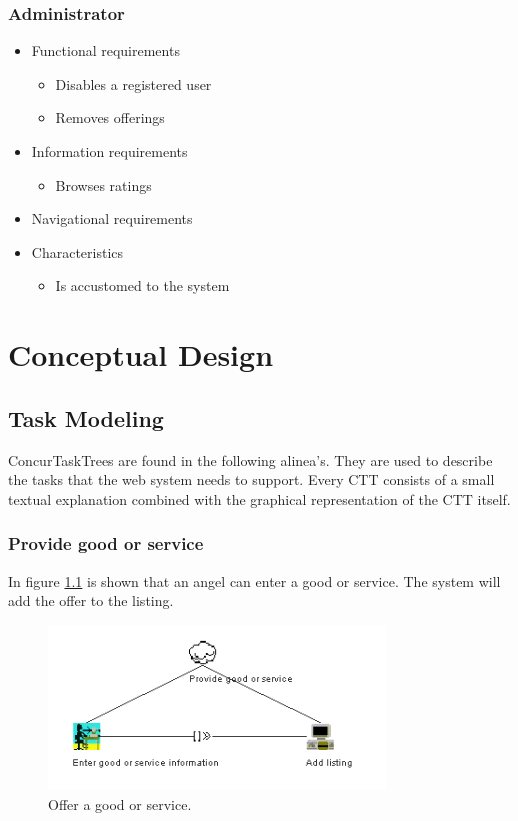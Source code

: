 \documentclass[a4paper]{report}
\begin{document}
\subsection{Administrator}
\begin{itemize}
	\item Functional requirements
	\begin{itemize}
		\item Disables a registered user
		\item Removes offerings
	\end{itemize}
	\item Information requirements
	\begin{itemize}
		\item Browses ratings
	\end{itemize}
	\item Navigational requirements
	\item Characteristics
	\begin{itemize}
		\item Is accustomed to the system
	\end{itemize}
\end{itemize}















\chapter{Conceptual Design}
\section{Task Modeling}
ConcurTaskTrees are found in the following alinea's. They are used to describe the tasks that the web system needs to support. Every CTT consists of a small textual explanation combined with the graphical representation of the CTT itself.

\subsection{Provide good or service}
In figure \ref{fig:CTTAddGood} is shown that an angel can enter a good or service. The system will add the offer to the listing.
\begin{figure}[h]
    \centering
    \includegraphics[width=0.8\textwidth]{CTT/CTTpng/CTTAddGood.png}
    \caption{Offer a good or service.}
    \label{fig:CTTAddGood}
\end{figure}
\end{document}
